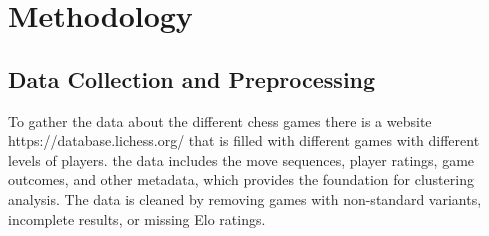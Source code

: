 \documentclass[conference]{IEEEtran}
\begin{document}
%
%
%

\section{Methodology}
\subsection{Data Collection and Preprocessing}
To gather the data about the different chess games there is a website https://database.lichess.org/ that is filled with different games with different levels of players. the data includes the move sequences, player ratings, game outcomes, and other metadata, which provides the foundation for clustering analysis. The data is cleaned by removing games with non-standard variants, incomplete results, or missing Elo ratings.
\end{document}
